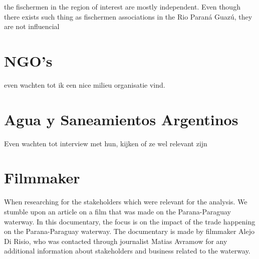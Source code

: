 the fischermen in the region of interest are mostly independent. Even though there exists such thing as fischermen associations in the Rio Paraná Guazú, they are not influencial 



\section{NGO's}
even wachten tot ik een nice milieu organisatie vind.

\section{Agua y Saneamientos Argentinos}
Even wachten tot interview met hun, kijken of ze wel relevant zijn


\section{Filmmaker}

When researching for the stakeholders which were relevant for the analysis. We stumble upon an article on a film that was made on the Parana-Paraguay waterway. In this documentary, the focus is on the impact of the trade happening on the Parana-Paraguay waterway. The documentary is made by filmmaker Alejo Di Risio, who was contacted through journalist Matias Avramow for any additional information about stakeholders and business related to the waterway.

